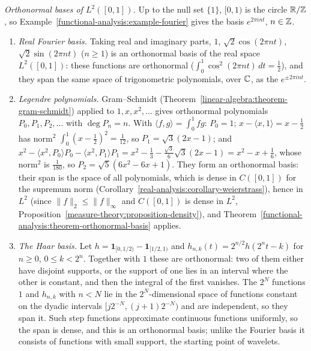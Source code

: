 \begin{example}\label{functional-analysis:example-bases-l2}
\emph{Orthonormal bases of $L^2([0, 1])$.} Up to the null set $\{1\}$, $[0, 1)$ is the circle $\mathbb{R}/\mathbb{Z}$, so Example~\ref{functional-analysis:example-fourier} gives the basis $e^{2\pi int}$, $n \in \mathbb{Z}$.
\begin{enumerate}
\item \emph{Real Fourier basis.} Taking real and imaginary parts, $1$, $\sqrt2\cos(2\pi nt)$, $\sqrt2\sin(2\pi nt)$ ($n \geq 1$) is an orthonormal basis of the real space $L^2([0, 1])$: these functions are
orthonormal ($\int_0^1\cos^2(2\pi nt)\,dt = \frac12$), and they span the same space of trigonometric polynomials, over $\mathbb{C}$, as the $e^{\pm2\pi int}$.
\item \emph{Legendre polynomials.} Gram--Schmidt (Theorem~\ref{linear-algebra:theorem-gram-schmidt}) applied to $1, x, x^2, \ldots$ gives orthonormal polynomials $P_0, P_1, P_2, \ldots$ with
$\deg P_n = n$. With $\langle f, g\rangle = \int_0^1fg$: $P_0 = 1$; $x - \langle x, 1\rangle = x - \frac12$ has norm$^2$ $\int_0^1(x - \frac12)^2 = \frac1{12}$, so $P_1 = \sqrt3(2x - 1)$; and
$x^2 - \langle x^2, P_0\rangle P_0 - \langle x^2, P_1\rangle P_1 = x^2 - \frac13 - \frac{\sqrt3}{6}\sqrt3(2x - 1) = x^2 - x + \frac16$, whose norm$^2$ is $\frac1{180}$, so $P_2 = \sqrt5(6x^2 - 6x + 1)$.
They form an orthonormal basis: their span is the space of all polynomials, which is dense in $C([0, 1])$ for the supremum norm (Corollary~\ref{real-analysis:corollary-weierstrass}), hence in
$L^2$ (since $\|f\|_2 \leq \|f\|_\infty$ and $C([0, 1])$ is dense in $L^2$, Proposition~\ref{measure-theory:proposition-density}), and Theorem~\ref{functional-analysis:theorem-orthonormal-basis} applies.
\item \emph{The Haar basis.} Let $h = \mathbf{1}_{[0, 1/2)} - \mathbf{1}_{[1/2, 1)}$ and $h_{n,k}(t) = 2^{n/2}h(2^nt - k)$ for $n \geq 0$, $0 \leq k < 2^n$. Together with $1$ these are orthonormal: two of them
either have disjoint supports, or the support of one lies in an interval where the other is constant, and then the integral of the first vanishes. The $2^N$ functions $1$ and $h_{n,k}$ with $n < N$ lie
in the $2^N$-dimensional space of functions constant on the dyadic intervals $[j2^{-N}, (j + 1)2^{-N})$ and are independent, so they span it. Such step functions approximate continuous functions
uniformly, so the span is dense, and this is an orthonormal basis; unlike the Fourier basis it consists of functions with small support, the starting point of wavelets.
\end{enumerate}
\end{example}

